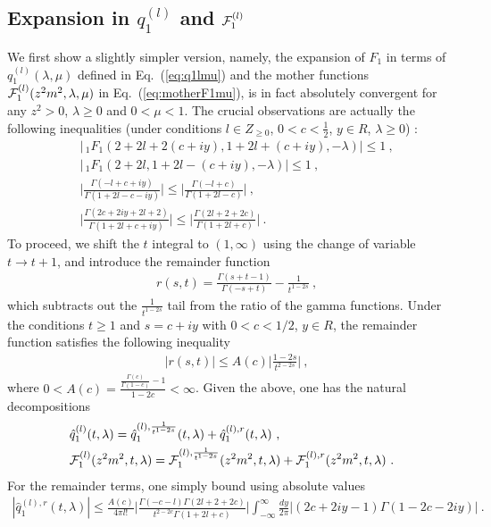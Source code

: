 \documentclass[a4paper,11pt]{article}
\begin{document}
\subsection{Expansion in $q_1^{(l)}$ and ${\cal F}_1^{(l)}$}
We first show a slightly simpler version, namely, the expansion of $F_1$ in terms of $q_1^{(l)}(\lambda,\mu)$ defined in Eq.~(\ref{eq:q1lmu}) and the mother functions ${\cal F}^{(l)}_1(z^2m^2,\lambda,\mu)$ in Eq.~(\ref{eq:motherF1mu}), is in fact absolutely convergent for any $z^2>0$, $\lambda \ge 0$ and $0<\mu<1$. The crucial observations are actually the following inequalities (under conditions $l\in Z_{\ge 0}$, $0<c<\frac{1}{2}$, $y\in R$, $\lambda \ge 0$) : 
\begin{align}
&\bigg|\,_1F_1(2+2l+2(c+iy),1+2l+(c+iy),-\lambda)\bigg| \le 1 \ , \\ 
&\bigg|\,_1F_1(2+2l,1+2l-(c+iy),-\lambda)\bigg| \le 1\ , \\ 
&\bigg|\frac{\Gamma(-l+c+iy)}{\Gamma(1+2l-c-iy)}\bigg| \le \bigg|\frac{\Gamma(-l+c)}{\Gamma(1+2l-c)}\bigg| \ , \\ 
&\bigg|\frac{\Gamma(2c+2iy+2l+2)}{\Gamma(1+2l+c+iy)}\bigg|\le \bigg|\frac{\Gamma(2l+2+2c)}{\Gamma(1+2l+c)} \bigg|\ .
\end{align}
To proceed, we shift the $t$ integral to $(1,\infty)$ using the change of variable $t \rightarrow t+1$, and introduce the remainder function
\begin{align} \label{eq:remainder}
&r(s,t)=\frac{\Gamma(s+t-1)}{\Gamma(-s+t)}-\frac{1}{t^{1-2s} } \ , 
\end{align}
which subtracts out the $\frac{1}{t^{1-2s}}$ tail from the ratio of the gamma functions. Under the conditions $t\ge 1$ and $s=c+iy$ with $0<c<1/2$, $y\in R$,  the remainder function satisfies the following inequality
\begin{align}
 &\bigg|r(s,t)\bigg| \le A(c)\bigg|\frac{1-2s}{t^{2-2s}} \bigg| \ ,
\end{align}
where $0<A(c)=\frac{\frac{\Gamma(c)}{\Gamma(1-c)}-1}{1-2c}<\infty$. Given the above, one has the natural decompositions
\begin{align}
&\hat q_1^{(l)}(t,\lambda)=\hat q_1^{(l),\frac{1}{t^{1-2s}}}(t,\lambda)+\hat q_1^{(l),r}(t,\lambda) \ , \\ 
&{\cal F}_1^{(l)}(z^2m^2,t,\lambda)={\cal F}_1^{(l),\frac{1}{t^{1-2s}}}(z^2m^2,t,\lambda)+{\cal F}_1^{(l),r}(z^2m^2,t,\lambda) \ .
\end{align}
For the remainder terms, one simply bound using absolute values 
\begin{align}
|\hat q_1^{(l),r}(t,\lambda)| \le \frac{A(c)}{4\pi l!} \bigg|\frac{\Gamma(-c-l)\Gamma(2l+2+2c)}{t^{2-2c}\Gamma(1+2l+c)}\bigg| \int_{-\infty}^{\infty} \frac{dy}{2\pi} \bigg|(2c+2iy-1)\Gamma(1-2c-2iy)\bigg| \ .
\end{align}
\end{document}
